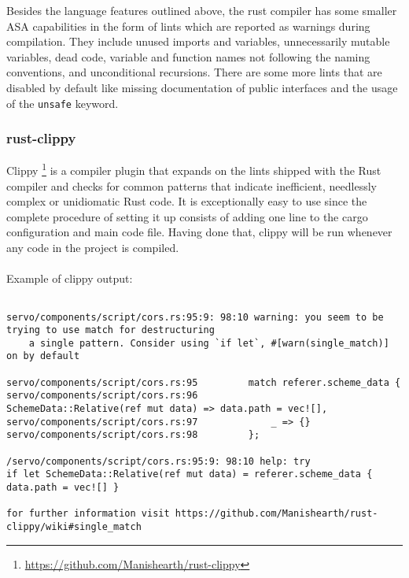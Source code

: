 \documentclass{scrartcl}
\begin{document}
Besides the language features outlined above, the rust compiler has some smaller ASA capabilities in the form of lints which are reported as warnings during compilation. They include unused imports and variables, unnecessarily mutable variables, dead code, variable and function names not following the naming conventions, and unconditional recursions. There are some more lints that are disabled by default like missing documentation of public interfaces and the usage of the \texttt{unsafe} keyword.

\subsubsection{rust-clippy}

Clippy \footnote{\url{https://github.com/Manishearth/rust-clippy}} is a compiler plugin that expands on the lints shipped with the Rust compiler and checks for common patterns that indicate inefficient, needlessly complex or unidiomatic Rust code. It is exceptionally easy to use since the complete procedure of setting it up consists of adding one line to the cargo configuration and main code file. Having done that, clippy will be run whenever any code in the project is compiled.\\
\\

Example of clippy output:
{
\scriptsize
\begin{verbatim}

servo/components/script/cors.rs:95:9: 98:10 warning: you seem to be trying to use match for destructuring
    a single pattern. Consider using `if let`, #[warn(single_match)] on by default
    
servo/components/script/cors.rs:95         match referer.scheme_data {
servo/components/script/cors.rs:96             SchemeData::Relative(ref mut data) => data.path = vec![],
servo/components/script/cors.rs:97             _ => {}
servo/components/script/cors.rs:98         };

/servo/components/script/cors.rs:95:9: 98:10 help: try
if let SchemeData::Relative(ref mut data) = referer.scheme_data { data.path = vec![] }

for further information visit https://github.com/Manishearth/rust-clippy/wiki#single_match

\end{verbatim}
}
\end{document}
